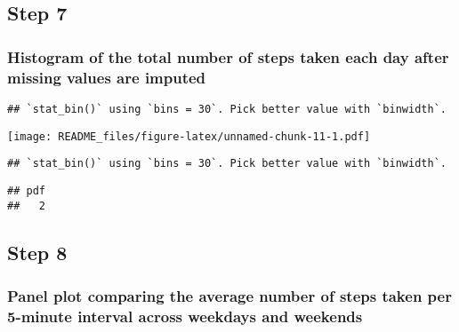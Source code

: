 \documentclass[
]{article}
\newenvironment{Shaded}{\begin{snugshade}}{\end{snugshade}}
\newcommand{\DataTypeTok}[1]{\textcolor[rgb]{0.13,0.29,0.53}{#1}}
\newcommand{\FloatTok}[1]{\textcolor[rgb]{0.00,0.00,0.81}{#1}}
\newcommand{\KeywordTok}[1]{\textcolor[rgb]{0.13,0.29,0.53}{\textbf{#1}}}
\newcommand{\NormalTok}[1]{#1}
\newcommand{\OperatorTok}[1]{\textcolor[rgb]{0.81,0.36,0.00}{\textbf{#1}}}
\newcommand{\StringTok}[1]{\textcolor[rgb]{0.31,0.60,0.02}{#1}}
\begin{document}
\hypertarget{step-7}{%
\subsection{Step 7}\label{step-7}}

\hypertarget{histogram-of-the-total-number-of-steps-taken-each-day-after-missing-values-are-imputed}{%
\subsubsection{Histogram of the total number of steps taken each day
after missing values are
imputed}\label{histogram-of-the-total-number-of-steps-taken-each-day-after-missing-values-are-imputed}}

\begin{Shaded}
\end{Shaded}

\begin{verbatim}
## `stat_bin()` using `bins = 30`. Pick better value with `binwidth`.
\end{verbatim}

\texttt{[image: README\_files/figure-latex/unnamed-chunk-11-1.pdf]}

\begin{verbatim}
## `stat_bin()` using `bins = 30`. Pick better value with `binwidth`.
\end{verbatim}

\begin{verbatim}
## pdf 
##   2
\end{verbatim}

\hypertarget{step-8}{%
\subsection{Step 8}\label{step-8}}

\hypertarget{panel-plot-comparing-the-average-number-of-steps-taken-per-5-minute-interval-across-weekdays-and-weekends}{%
\subsubsection{Panel plot comparing the average number of steps taken
per 5-minute interval across weekdays and
weekends}\label{panel-plot-comparing-the-average-number-of-steps-taken-per-5-minute-interval-across-weekdays-and-weekends}}
\end{document}
